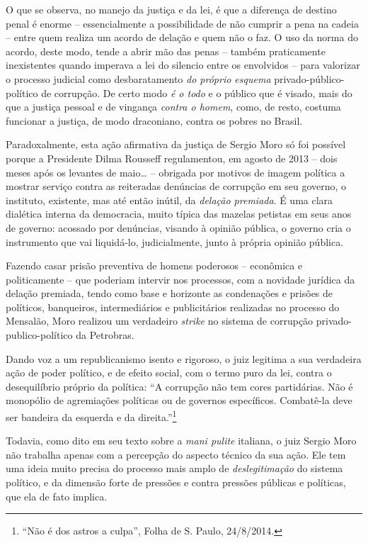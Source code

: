 O que se observa, no manejo da justiça e da lei, é que a diferença de
destino penal é enorme -- essencialmente a possibilidade de não cumprir a
pena na cadeia -- entre quem realiza um acordo de delação e quem não o
faz. O uso da norma do acordo, deste modo, tende a abrir mão das penas
-- também praticamente inexistentes quando imperava a lei do silencio
entre os envolvidos -- para valorizar o processo judicial como
desbaratamento \emph{do próprio esquema} privado-público-político de
corrupção. De certo modo \emph{é o todo} e o público que é visado, mais
do que a justiça pessoal e de vingança \emph{contra o homem}, como, de
resto, costuma funcionar a justiça, de modo draconiano, contra os pobres
no Brasil.

Paradoxalmente, esta ação afirmativa da justiça de Sergio Moro só foi
possível porque a Presidente Dilma Rousseff regulamentou, em agosto de
2013 -- dois meses após os levantes de maio… -- obrigada por motivos
de imagem política a mostrar serviço contra as reiteradas denúncias de
corrupção em seu governo, o instituto, existente, mas até então inútil,
da \emph{delação premiada}. É uma clara dialética interna da democracia,
muito típica das mazelas petistas em seus anos de governo: acossado por
denúncias, visando à opinião pública, o governo cria o instrumento que
vai liquidá-lo, judicialmente, junto à própria opinião pública.

Fazendo casar prisão preventiva de homens poderosos -- econômica e
politicamente -- que poderiam intervir nos processos, com a novidade
jurídica da delação premiada, tendo como base e horizonte as condenações
e prisões de políticos, banqueiros, intermediários e publicitários
realizadas no processo do Mensalão, Moro realizou um verdadeiro
\emph{strike} no sistema de corrupção privado-publico-político da
Petrobras.

Dando voz a um republicanismo isento e rigoroso, o juiz legitima a sua
verdadeira ação de poder político, e de efeito social, com o termo puro
da lei, contra o desequilíbrio próprio da política: ``A corrupção não
tem cores partidárias. Não é monopólio de agremiações políticas ou de
governos específicos. Combatê-la deve ser bandeira da esquerda e da
direita.''\footnote{``Não é dos astros a culpa'', Folha de S. Paulo,
  24/8/2014.}

Todavia, como dito em seu texto sobre a \emph{mani pulite} italiana, o
juiz Sergio Moro não trabalha apenas com a percepção do aspecto técnico
da sua ação. Ele tem uma ideia muito precisa do processo mais amplo de
\emph{deslegitimação} do sistema político, e da dimensão forte de
pressões e contra pressões públicas e políticas, que ela de fato
implica.

